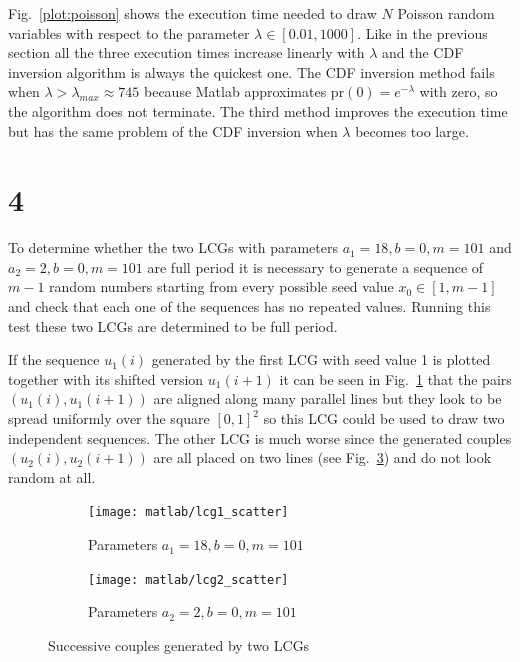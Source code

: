 \documentclass[a4paper,oneside]{article}
\begin{document}
Fig.~\ref{plot:poisson} shows the execution time needed to draw $N$
Poisson random variables with respect to the parameter $\lambda \in
[0.01, 1000]$. Like in the previous section all the three execution
times increase linearly with $\lambda$ and the CDF inversion algorithm
is always the quickest one. The CDF inversion method fails when
$\lambda > \lambda_{max} \approx 745$ because Matlab approximates $\mathrm{pr}(0) =
e^{-\lambda}$ with zero, so the algorithm does not terminate. The
third method improves the execution time but has the same problem of
the CDF inversion when $\lambda$ becomes too large.
\section*{4}
To determine whether the two LCGs with parameters $a_1 = 18, b=0,
m=101$ and $a_2 = 2, b=0, m=101$ are full period it is necessary to
generate a sequence of $m-1$ random numbers starting from every
possible seed value $x_0 \in [1, m-1]$ and check that each one of the
sequences has no repeated values. Running this test these two LCGs are
determined to be full period.

If the sequence $u_1(i)$ generated by the first LCG with seed value 1
is plotted together with its shifted version $u_1(i+1)$ it can be seen
in Fig.~\ref{plot:lcg1_scatter} that the pairs $(u_1(i), u_1(i+1))$
are aligned along many parallel lines but they look to be spread
uniformly over the square $[0,1]^2$ so this LCG could be used to draw
two independent sequences. The other LCG is much worse since the
generated couples $(u_2(i), u_2(i+1))$ are all placed on two lines
(see Fig.~\ref{plot:lcg2_scatter}) and do not look random at all.
\begin{figure}[htbp]
  \centering
  \begin{subfigure}{0.5\textwidth}
    \centering
    \texttt{[image: matlab/lcg1\_scatter]}
    \caption{Parameters $a_1 = 18, b=0, m=101$}
    \label{plot:lcg1_scatter}
  \end{subfigure}%
  \begin{subfigure}{0.5\textwidth}
    \centering
    \texttt{[image: matlab/lcg2\_scatter]}
    \caption{Parameters $a_2 = 2, b=0, m=101$}
    \label{plot:lcg2_scatter}
  \end{subfigure}
  \caption{Successive couples generated by two LCGs}
\end{figure}
\end{document}
